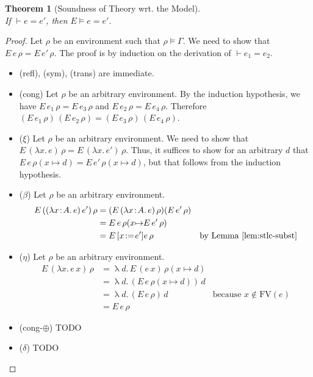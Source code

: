 \documentclass{tufte-handout}
\newcommand{\LAM}[1]{\lambda #1.\,}
\newcommand{\APP}[0]{\,}
\newcommand{\of}[0]{\!:\!}
\newcommand{\by}[0]{\!:=\!}
\newcommand{\ext}[3]{#3(#1{\mapsto}#2)}
\newtheorem{theorem}{Theorem}%
\begin{document}
\begin{theorem}[Soundness of Theory wrt. the Model]\ \\
  \noindent
  If $\vdash e = e'$, then $E \models e = e'$.
\end{theorem}
\begin{proof}
  Let $\rho$ be an environment such that $\rho \models \Gamma$.
  We need to show that $E\,e\,\rho = E\,e'\,\rho$.
  The proof is by induction on the derivation of $\vdash e_1 = e_2$.
  \begin{itemize}
  \item (refl), (sym), (trans) are immediate.
  \item (cong)
    Let $\rho$ be an arbitrary environment.
    By the induction hypothesis, we have $E\,e_1\,\rho = E\,e_3\,\rho$
    and $E\,e_2\,\rho = E\,e_4\,\rho$. Therefore
    $(E\,e_1\,\rho)\APP(E\,e_2\,\rho) = (E\,e_3\,\rho) \APP (E\,e_4\,\rho)$.
    
  \item ($\xi$) Let $\rho$ be an arbitrary environment.  We need to
    show that $E\,(\LAM{x}e)\,\rho = E\,(\LAM{x}e')\,\rho$. Thus, it
    suffices to show for an arbitrary $d$ that
    $E\, e\, \ext{x}{d}{\rho} = E\, e'\, \ext{x}{d}{\rho}$,
    but that follows from the induction hypothesis.
    
  \item ($\beta$) Let $\rho$ be an arbitrary environment.
    \begin{align*}
      E\,((\LAM{x\of A}e)\APP e')\,\rho &=
      (E\,(\LAM{x\of A}e)\,\rho) (E\,e'\,\rho) \\
      &= E\,e\,\ext{x}{E\,e'\,\rho}{\rho} \\
      &= E\,[x\by e']e\,\rho  & \text{by Lemma~\ref{lem:stlc-subst}}
    \end{align*}
    
  \item ($\eta$) Let $\rho$ be an arbitrary environment.
    \begin{align*}
      E\,(\LAM{x} e \APP x)\,\rho &=
      \uplambda d.\,E\,(e \APP x)\,\ext{x}{d}{\rho} \\
      &= \uplambda d.\,(E\,e\,\ext{x}{d}{\rho}) \APP d \\
      &= \uplambda d.\,(E\,e\,\rho) \APP d & \text{because } x \notin \mathrm{FV}(e)\\
      &= E\,e\,\rho
    \end{align*}

  \item (cong-$\oplus$) TODO

  \item ($\delta$) TODO

  \end{itemize}
\end{proof}
\end{document}
